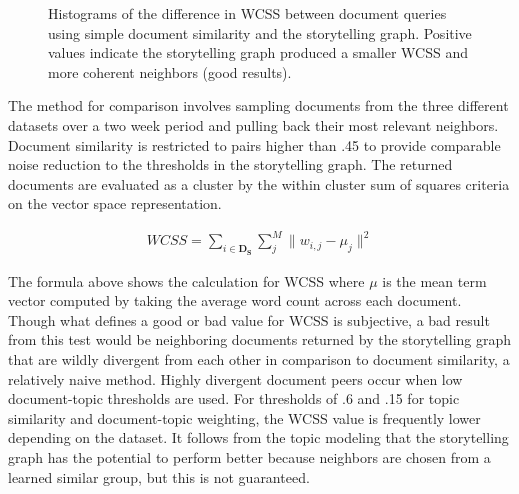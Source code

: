 \documentclass[10pt]{article}
\begin{document}
\begin{figure}
{}
\caption{Histograms of the difference in WCSS between document queries using simple document similarity and the storytelling graph.  Positive values indicate the storytelling graph produced a smaller WCSS and more coherent neighbors (good results).  }
\end{figure}

The method for comparison involves sampling documents from the three different datasets over a two week period and pulling back their most relevant neighbors.   Document similarity is restricted to pairs higher than .45 to provide comparable noise reduction to the thresholds in the storytelling graph.  The returned documents are evaluated as a cluster by the within cluster sum of squares criteria on the vector space representation.  

\begin{align}
WCSS = \sum_{i\in\textbf{D}_\textbf{S}}\sum_{j}^M \|w_{i,j} - \mu_j\|^2
\end{align}

The formula above shows the calculation for WCSS where $\mu$ is the mean term vector computed by taking the average word count across each document.  Though what defines a good or bad value for WCSS is subjective, a bad result from this test would be neighboring documents returned by the storytelling graph that are wildly divergent from each other in comparison to document similarity, a relatively naive method.  Highly divergent document peers occur when low document-topic thresholds are used. For thresholds of .6 and .15 for topic similarity and document-topic weighting, the WCSS value is frequently lower depending on the dataset. It follows from the topic modeling that the storytelling graph has the potential to perform better because neighbors are chosen from a learned similar group, but this is not guaranteed.  
\end{document}
